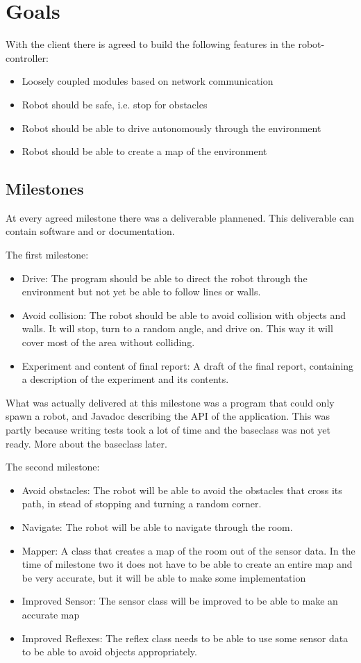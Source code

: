 \documentclass[titlepage, a4paper,10pt]{article}
\begin{document}
\newpage

\section{Goals}
With the client there is agreed to build the following features in the robot-controller:
\begin{itemize}
\item Loosely coupled modules based on network communication
\item Robot should be safe, i.e. stop for obstacles
\item Robot should be able to drive autonomously through the environment
\item Robot should be able to create a map of the environment
\end{itemize}

\subsection{Milestones}
At every agreed milestone there was a deliverable plannened. This deliverable can contain software and or documentation.

The first milestone:
\begin{itemize}
\item Drive: The program should be able to direct the robot through the environment but not yet be able to follow lines or walls.
\item Avoid collision: The robot should be able to avoid collision with objects and walls. It will stop, turn to a random angle, and drive on. This way it will cover most of the area without colliding.
\item Experiment and content of final report: A draft of the final report, containing a description of the experiment and its contents.
\end{itemize}

What was actually delivered at this milestone was a program that could only spawn a robot, and Javadoc describing the API of the application. This was partly because writing tests took a lot of time and the baseclass was not yet ready. More about the baseclass later.

The second milestone:
\begin{itemize}
\item Avoid obstacles: The robot will be able to avoid the obstacles that cross its path, in stead of stopping and turning a random corner.
\item Navigate: The robot will be able to navigate through the room.
\item Mapper: A class that creates a map of the room out of the sensor data. In the time of milestone two it does not have to be able to create an entire map and be very accurate, but it will be able to make some implementation
\item Improved Sensor: The sensor class will be improved to be able to make an accurate map
\item Improved Reflexes: The reflex class needs to be able to use some sensor data to be able to avoid objects appropriately.
\end{itemize}
\end{document}
